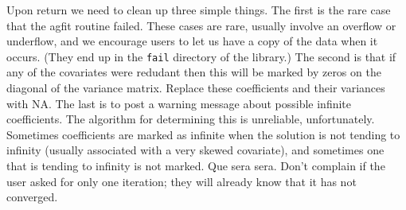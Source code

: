\documentclass{article}
\newcommand{\code}[1]{\texttt{#1}}
\begin{document}
Upon return we need to clean up three simple things.
The first is the rare case that the agfit routine failed.
These cases are rare, usually involve an overflow or underflow, and
we encourage users to let us have a copy of the data when it occurs.
(They end up in the \code{fail} directory of the library.)
The second is that if any of the covariates were redudant then this
will be marked by zeros on the diagonal of the variance matrix.
Replace these coefficients and their variances with NA.
The last is to post a warning message about possible infinite coefficients.
The algorithm for determining this is unreliable, unfortunately.  
Sometimes coefficients are marked as infinite when the solution is not tending
to infinity (usually associated with a very skewed covariate), and sometimes
one that is tending to infinity is not marked.  Que sera sera.
Don't complain if the user asked for only one iteration; they will already
know that it has not converged.
\end{document}
